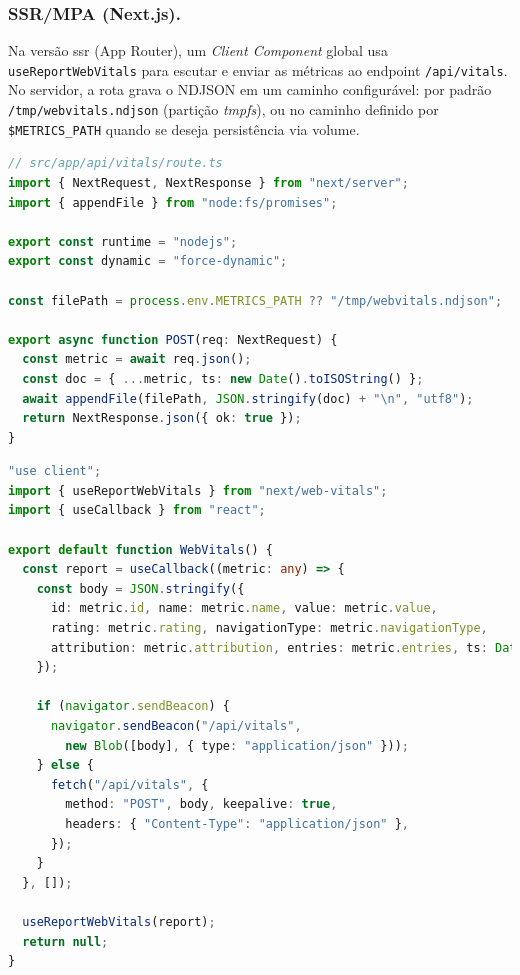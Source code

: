 \subsubsection{SSR/MPA (Next.js).}
Na versão \acrshort{ssr} (App Router), um \textit{Client Component} global usa \texttt{useReportWebVitals} para escutar e enviar as métricas ao endpoint \texttt{/api/vitals}. No servidor, a rota grava o NDJSON em um caminho configurável: por padrão \texttt{/tmp/webvitals.ndjson} (partição \textit{tmpfs}), ou no caminho definido por \texttt{\$METRICS\_PATH} quando se deseja persistência via volume.

\begin{lstlisting}[language=TypeScript,caption={Endpoint de métricas no SSR/Next.js (visão de servidor)}]
// src/app/api/vitals/route.ts
import { NextRequest, NextResponse } from "next/server";
import { appendFile } from "node:fs/promises";

export const runtime = "nodejs";
export const dynamic = "force-dynamic";

const filePath = process.env.METRICS_PATH ?? "/tmp/webvitals.ndjson";

export async function POST(req: NextRequest) {
  const metric = await req.json();
  const doc = { ...metric, ts: new Date().toISOString() };
  await appendFile(filePath, JSON.stringify(doc) + "\n", "utf8");
  return NextResponse.json({ ok: true });
}
\end{lstlisting}

\begin{lstlisting}[language=TypeScript,caption={Envio de métricas no cliente (SSR/Next.js)}]
"use client";
import { useReportWebVitals } from "next/web-vitals";
import { useCallback } from "react";

export default function WebVitals() {
  const report = useCallback((metric: any) => {
    const body = JSON.stringify({
      id: metric.id, name: metric.name, value: metric.value,
      rating: metric.rating, navigationType: metric.navigationType,
      attribution: metric.attribution, entries: metric.entries, ts: Date.now(),
    });

    if (navigator.sendBeacon) {
      navigator.sendBeacon("/api/vitals",
        new Blob([body], { type: "application/json" }));
    } else {
      fetch("/api/vitals", {
        method: "POST", body, keepalive: true,
        headers: { "Content-Type": "application/json" },
      });
    }
  }, []);

  useReportWebVitals(report);
  return null;
}
\end{lstlisting}

